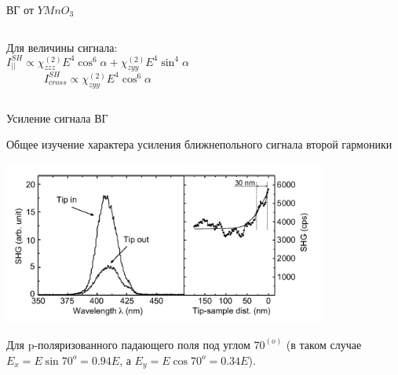 \documentclass[9pt, compress, xcolor=table]{beamer}
\begin{document}
\begin{frame}{ВГ от $Y Mn O_3$}
\begin{columns}
\begin{center}
Для величины сигнала:
\begin{equation*}
I_{||}^{SH} \propto \chi_{zzz}^{(2)}E^4 \cos^6 \alpha +\chi_{zyy}^{(2)}E^4 \sin^4 \alpha
\end{equation*}
\begin{equation*}
I_{cross}^{SH} \propto \chi_{zyy}^{(2)}E^4 \cos^6 \alpha
\end{equation*}
\end{center}

\end{columns}

\end{frame}

\begin{frame}{Усиление сигнала ВГ}

Общее изучение характера усиления ближнепольного сигнала второй гармоники 

\begin{center}
\includegraphics[width=0.8\textwidth]{shg16}

\end{center}

Для p-поляризованного падающего поля под углом $70 ^{(o)}$ (в таком случае $E_x = E \sin 70^{o} = 0.94 E$, а $E_y = E \cos 70 ^{o} = 0.34 E$).

\end{frame}
\end{document}
